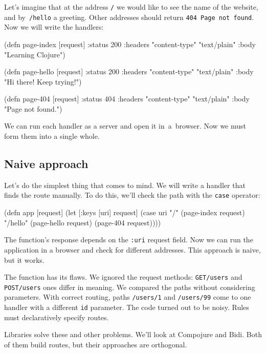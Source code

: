 
Let's imagine that at the address \verb|/| we would like to see the name of the website, and by~\verb|/hello| a greeting. Other addresses should return \verb|404 Page not found|. Now we will write the handlers:

\begin{english}
\begin{clojure}
(defn page-index [request]
{:status 200
:headers {"content-type" "text/plain"}
:body "Learning Clojure"})

(defn page-hello [request]
{:status 200
:headers {"content-type" "text/plain"}
:body "Hi there! Keep trying!"})

(defn page-404 [request]
{:status 404
:headers {"content-type" "text/plain"}
:body "Page not found."})
\end{clojure}
\end{english}

We can run each handler as a server and open it in~a~browser. Now we must form them into a single whole.

\subsection{Naive approach}

Let's do the simplest thing that comes to mind. We will write a handler that finds the route manually. To do this, we'll check the path with the \verb|case| operator:

\begin{english}
\begin{clojure}
(defn app [request]
(let [{:keys [uri]} request]
(case uri
"/"      (page-index request)
"/hello" (page-hello request)
(page-404 request))))
\end{clojure}
\end{english}

The function's response depends on the \verb|:uri| request field. Now we can run the application in a browser and check for different addresses. This approach is naive, but it works.

The function has its flaws. We ignored the request methods: \verb|GET/users| and \verb|POST/users| ones differ in meaning. We compared the paths without considering parameters. With correct routing, paths \verb|/users/1| and \verb|/users/99| come to one handler with a different \verb|id| parameter. The code turned out to be noisy. Rules must declaratively specify routes.

Libraries solve these and other problems. We'll look at Compojure and Bidi. Both of them build routes, but their approaches are orthogonal.

